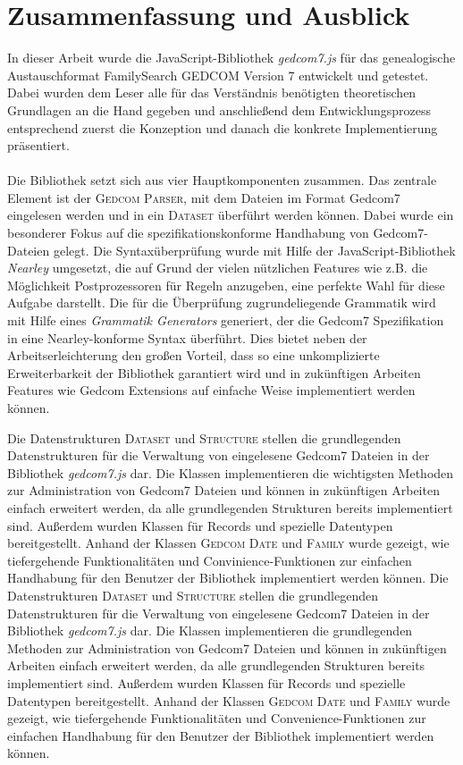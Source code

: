 \chapter{Zusammenfassung und Ausblick}
\label{chap: Zusammenfassung und Ausblick}
In dieser Arbeit wurde die JavaScript-Bibliothek \textit{gedcom7.js} für das genealogische Austauschformat FamilySearch GEDCOM Version 7 entwickelt und getestet. Dabei wurden dem Leser alle für das Verständnis benötigten theoretischen Grundlagen an die Hand gegeben und anschließend dem Entwicklungsprozess entsprechend zuerst die Konzeption und danach die konkrete Implementierung präsentiert. 
\\ \\
Die Bibliothek setzt sich aus vier Hauptkomponenten zusammen. Das zentrale Element ist der \textsc{Gedcom Parser}, mit dem Dateien im Format Gedcom7 eingelesen werden und in ein \textsc{Dataset} überführt werden können.
Dabei wurde ein besonderer Fokus auf die spezifikationskonforme Handhabung von Gedcom7-Dateien gelegt. Die Syntaxüberprüfung wurde mit Hilfe der JavaScript-Bibliothek \textit{Nearley} umgesetzt, die auf Grund der vielen nützlichen Features wie z.B. die Möglichkeit Postprozessoren für Regeln anzugeben, eine perfekte Wahl für diese Aufgabe darstellt. Die für die Überprüfung zugrundeliegende Grammatik wird mit Hilfe eines \textit{Grammatik Generators} generiert, der die Gedcom7 Spezifikation in eine Nearley-konforme Syntax überführt. Dies bietet neben der Arbeitserleichterung den großen Vorteil, dass so eine unkomplizierte Erweiterbarkeit der Bibliothek garantiert wird und in zukünftigen Arbeiten Features wie Gedcom Extensions auf einfache Weise implementiert werden können. 


Die Datenstrukturen \textsc{Dataset} und \textsc{Structure} stellen die grundlegenden Datenstrukturen für die Verwaltung von eingelesene Gedcom7 Dateien in der Bibliothek \textit{gedcom7.js} dar. Die Klassen implementieren die wichtigsten Methoden zur Administration von Gedcom7 Dateien und können in zukünftigen Arbeiten einfach erweitert werden, da alle grundlegenden Strukturen bereits implementiert sind. Außerdem wurden Klassen für Records und spezielle Datentypen bereitgestellt. Anhand der Klassen \textsc{Gedcom Date} und \textsc{Family} wurde gezeigt, wie tiefergehende Funktionalitäten und Convinience-Funktionen zur einfachen Handhabung für den Benutzer der Bibliothek implementiert werden können. 
Die Datenstrukturen \textsc{Dataset} und \textsc{Structure} stellen die grundlegenden Datenstrukturen für die Verwaltung von eingelesene Gedcom7 Dateien in der Bibliothek \textit{gedcom7.js} dar. Die Klassen implementieren die grundlegenden Methoden zur Administration von Gedcom7 Dateien und können in zukünftigen Arbeiten einfach erweitert werden, da alle grundlegenden Strukturen bereits implementiert sind. Außerdem wurden Klassen für Records und spezielle Datentypen bereitgestellt. Anhand der Klassen \textsc{Gedcom Date} und \textsc{Family} wurde gezeigt, wie tiefergehende Funktionalitäten und Convenience-Funktionen zur einfachen Handhabung für den Benutzer der Bibliothek implementiert werden können. 


